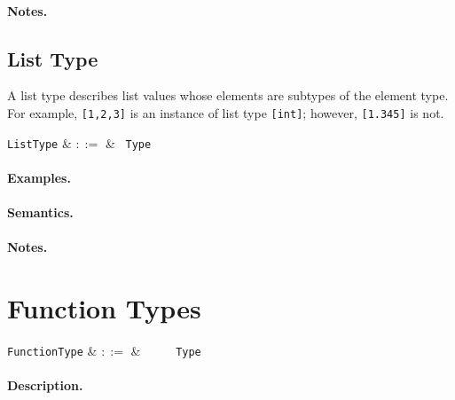\paragraph{Notes.} 


\subsection{List Type}

A list type describes list values whose elements are subtypes of the element type. For example, \lstinline{[1,2,3]} is an instance of list type \lstinline{[int]}; however, \lstinline{[1.345]} is not.

\begin{syntax}
  \verb+ListType+ & $::=$ & \token{[} \ \verb+Type+ \ \token{]}\\
\end{syntax}

\paragraph{Examples.}

\paragraph{Semantics.}

\paragraph{Notes.} 


\section{Function Types}

\begin{syntax}
  \verb+FunctionType+ & $::=$ & \ \token{(}\
  \ \token{)}\ \token{=>}\ \verb+Type+\\
\end{syntax}

\paragraph{Description.}  

